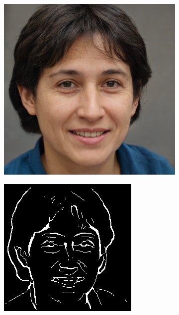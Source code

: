 \documentclass{70_styles/svproc}
\begin{document}
\begin{figure}
     \centering
     \begin{subfigure}[H]{0.2\textwidth}
         \centering
         \includegraphics[width=\textwidth]{70_figures/seed7914.png}
     \end{subfigure}
     \begin{subfigure}[H]{0.2\textwidth}
         \centering
         \includegraphics[width=\textwidth]{70_figures/seed7914_EM.png}

\end{subfigure}
\end{figure}
\end{document}
